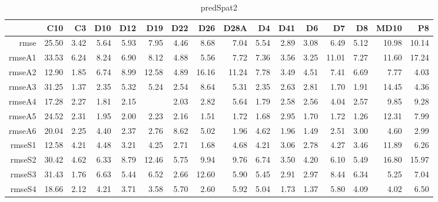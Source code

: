 \begin{table}[H]
\centering
\begin{tabular}{rrrrrrrrrrrrrrrr}
  \hline
 & C10 & C3 & D10 & D12 & D19 & D22 & D26 & D28A & D4 & D41 & D6 & D7 & D8 & MD10 & P8 \\ 
  \hline
rmse & 25.50 & 3.42 & 5.64 & 5.93 & 7.95 & 4.46 & 8.68 & 7.04 & 5.54 & 2.89 & 3.08 & 6.49 & 5.12 & 10.98 & 10.14 \\ 
  rmseA1 & 33.53 & 6.24 & 8.24 & 6.90 & 8.12 & 4.88 & 5.56 & 7.72 & 7.36 & 3.56 & 3.25 & 11.01 & 7.27 & 11.60 & 17.24 \\ 
  rmseA2 & 12.90 & 1.85 & 6.74 & 8.99 & 12.58 & 4.89 & 16.16 & 11.24 & 7.78 & 3.49 & 4.51 & 7.41 & 6.69 & 7.77 & 4.03 \\ 
  rmseA3 & 31.25 & 1.37 & 2.35 & 5.32 & 5.24 & 2.54 & 8.64 & 5.31 & 2.35 & 2.63 & 2.81 & 1.70 & 1.91 & 14.45 & 4.36 \\ 
  rmseA4 & 17.28 & 2.27 & 1.81 & 2.15 &  & 2.03 & 2.82 & 5.64 & 1.79 & 2.58 & 2.56 & 4.04 & 2.57 & 9.85 & 9.28 \\ 
  rmseA5 & 24.52 & 2.31 & 1.95 & 2.00 & 2.23 & 2.16 & 1.51 & 1.72 & 1.68 & 2.95 & 1.70 & 1.72 & 1.26 & 12.31 & 7.99 \\ 
  rmseA6 & 20.04 & 2.25 & 4.40 & 2.37 & 2.76 & 8.62 & 5.02 & 1.96 & 4.62 & 1.96 & 1.49 & 2.51 & 3.00 & 4.60 & 2.99 \\ 
  rmseS1 & 12.58 & 4.21 & 4.48 & 3.21 & 4.25 & 2.71 & 1.68 & 4.68 & 4.21 & 3.06 & 2.78 & 4.27 & 3.46 & 11.89 & 6.26 \\ 
  rmseS2 & 30.42 & 4.62 & 6.33 & 8.79 & 12.46 & 5.75 & 9.94 & 9.76 & 6.74 & 3.50 & 4.20 & 6.10 & 5.49 & 16.80 & 15.97 \\ 
  rmseS3 & 31.43 & 1.76 & 6.63 & 5.44 & 6.52 & 2.66 & 12.60 & 5.90 & 5.45 & 2.91 & 2.97 & 8.44 & 6.34 & 5.25 & 7.04 \\ 
  rmseS4 & 18.66 & 2.12 & 4.21 & 3.71 & 3.58 & 5.70 & 2.60 & 5.92 & 5.04 & 1.73 & 1.37 & 5.80 & 4.09 & 4.02 & 6.50 \\ 
   \hline
\end{tabular}
\caption{predSpat2} 
\end{table}
